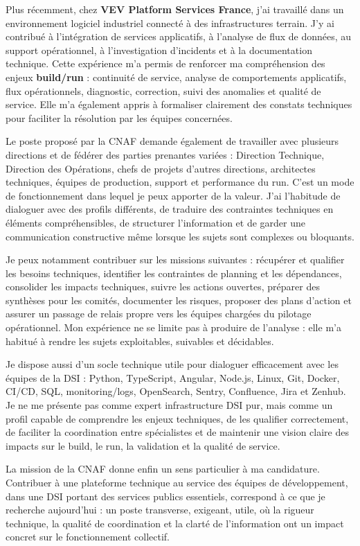 \documentclass[11pt,a4paper]{altacv}
\begin{document}
{Plus récemment, chez \textbf{VEV Platform Services France}, j'ai travaillé dans un environnement logiciel industriel connecté à des infrastructures terrain. J'y ai contribué à l'intégration de services applicatifs, à l'analyse de flux de données, au support opérationnel, à l'investigation d'incidents et à la documentation technique. Cette expérience m'a permis de renforcer ma compréhension des enjeux \textbf{build/run} : continuité de service, analyse de comportements applicatifs, flux opérationnels, diagnostic, correction, suivi des anomalies et qualité de service. Elle m'a également appris à formaliser clairement des constats techniques pour faciliter la résolution par les équipes concernées.

Le poste proposé par la CNAF demande également de travailler avec plusieurs directions et de fédérer des parties prenantes variées : Direction Technique, Direction des Opérations, chefs de projets d'autres directions, architectes techniques, équipes de production, support et performance du run. C'est un mode de fonctionnement dans lequel je peux apporter de la valeur. J'ai l'habitude de dialoguer avec des profils différents, de traduire des contraintes techniques en éléments compréhensibles, de structurer l'information et de garder une communication constructive même lorsque les sujets sont complexes ou bloquants.

Je peux notamment contribuer sur les missions suivantes : récupérer et qualifier les besoins techniques, identifier les contraintes de planning et les dépendances, consolider les impacts techniques, suivre les actions ouvertes, préparer des synthèses pour les comités, documenter les risques, proposer des plans d'action et assurer un passage de relais propre vers les équipes chargées du pilotage opérationnel. Mon expérience ne se limite pas à produire de l'analyse : elle m'a habitué à rendre les sujets exploitables, suivables et décidables.

Je dispose aussi d'un socle technique utile pour dialoguer efficacement avec les équipes de la DSI : Python, TypeScript, Angular, Node.js, Linux, Git, Docker, CI/CD, SQL, monitoring/logs, OpenSearch, Sentry, Confluence, Jira et Zenhub. Je ne me présente pas comme expert infrastructure DSI pur, mais comme un profil capable de comprendre les enjeux techniques, de les qualifier correctement, de faciliter la coordination entre spécialistes et de maintenir une vision claire des impacts sur le build, le run, la validation et la qualité de service.

La mission de la CNAF donne enfin un sens particulier à ma candidature. Contribuer à une plateforme technique au service des équipes de développement, dans une DSI portant des services publics essentiels, correspond à ce que je recherche aujourd'hui : un poste transverse, exigeant, utile, où la rigueur technique, la qualité de coordination et la clarté de l'information ont un impact concret sur le fonctionnement collectif.

}
\end{document}
